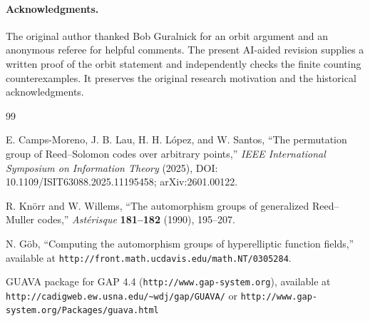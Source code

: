 \documentclass[12pt]{article}
\numberwithin{equation}{section}
\begin{document}
\paragraph{Acknowledgments.}
The original author thanked Bob Guralnick for an orbit
argument and an anonymous referee for helpful comments.
The present AI-aided revision supplies a written proof of
the orbit statement and independently checks the finite
counting counterexamples.  It preserves the original
research motivation and the historical acknowledgments.

\begin{thebibliography}{99}

E. Camps-Moreno, J. B. Lau, H. H. L\'opez, and W. Santos,
``The permutation group of Reed--Solomon codes over arbitrary points,''
\emph{IEEE International Symposium on Information Theory} (2025),
DOI: 10.1109/ISIT63088.2025.11195458;
arXiv:2601.00122.

R. Kn\"orr and W. Willems, ``The automorphism groups of generalized
Reed--Muller codes,'' \emph{Ast\'erisque} \textbf{181--182} (1990),
195--207.
  

%
%
%
%
% 
%


 N. G\"ob, ``Computing the automorphism groups of
hyperelliptic function fields,'' available at
\verb+http://front.math.ucdavis.edu/math.NT/0305284+.

GUAVA package for GAP 4.4 (\verb+http://www.gap-system.org+),
available at
\verb+http://cadigweb.ew.usna.edu/~wdj/gap/GUAVA/+
or
\newline
\verb+http://www.gap-system.org/Packages/guava.html+


\end{thebibliography}
\end{document}
